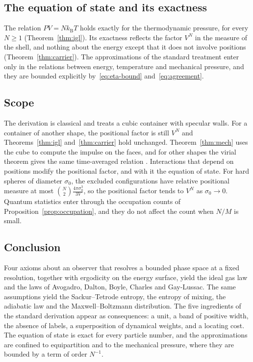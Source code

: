 \documentclass[11pt,a4paper]{article}
\theoremstyle{definition}
\theoremstyle{remark}
\newcommand{\kB}{k_{\mathrm{B}}}
\begin{document}
\subsection{The equation of state and its exactness}

The relation $PV=N\kB T$ holds exactly for the thermodynamic pressure, for every $N\ge1$ (Theorem~\ref{thm:igl}).
Its exactness reflects the factor $V^{N}$ in the measure of the shell, and nothing about the energy except that it does not involve positions (Theorem~\ref{thm:carrier}).
The approximations of the standard treatment enter only in the relations between energy, temperature and mechanical pressure, and they are bounded explicitly by~\eqref{eq:eta-bound} and~\eqref{eq:agreement}.

\subsection{Scope}

The derivation is classical and treats a cubic container with specular walls.
For a container of another shape, the positional factor is still $V^{N}$ and Theorems~\ref{thm:igl} and~\ref{thm:carrier} hold unchanged.
Theorem~\ref{thm:mech} uses the cube to compute the impulse on the faces, and for other shapes the virial theorem gives the same time-averaged relation \citep{clausius1870}.
Interactions that depend on positions modify the positional factor, and with it the equation of state.
For hard spheres of diameter $\sigma_0$, the excluded configurations have relative positional measure at most $\binom N2\frac{4\pi\sigma_0^{3}}{3V}$, so the positional factor tends to $V^{N}$ as $\sigma_0\to0$.
Quantum statistics enter through the occupation counts of Proposition~\ref{prop:occupation}, and they do not affect the count when $N/M$ is small.

\subsection{Conclusion}

Four axioms about an observer that resolves a bounded phase space at a fixed resolution, together with ergodicity on the energy surface, yield the ideal gas law and the laws of Avogadro, Dalton, Boyle, Charles and Gay-Lussac.
The same assumptions yield the Sackur--Tetrode entropy, the entropy of mixing, the adiabatic law and the Maxwell--Boltzmann distribution.
The five ingredients of the standard derivation appear as consequences: a unit, a band of positive width, the absence of labels, a superposition of dynamical weights, and a locating cost.
The equation of state is exact for every particle number, and the approximations are confined to equipartition and to the mechanical pressure, where they are bounded by a term of order $N^{-1}$.



\end{document}

